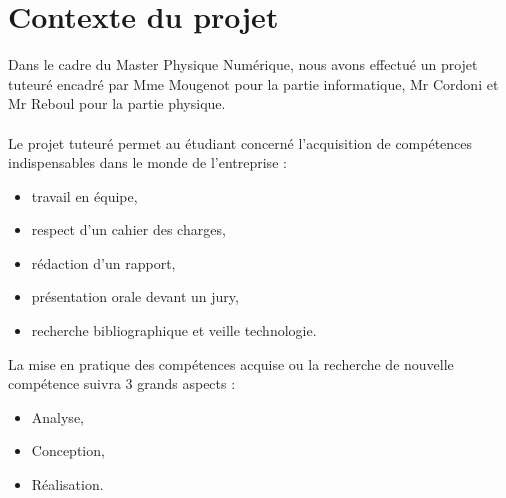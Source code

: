 \documentclass[12pt, a4paper]{report}
\begin{document}
\section{ Contexte du projet}
Dans le cadre du Master Physique Numérique, nous avons effectué un projet tuteuré encadré par Mme Mougenot pour la partie informatique, Mr Cordoni et Mr Reboul pour la partie physique.
\\
\\
Le projet tuteuré permet au étudiant concerné l'acquisition de compétences indispensables dans le monde de l'entreprise : \\
\begin{itemize}
	\item travail en équipe,
	\item respect d'un cahier des charges,
	\item rédaction d'un rapport,
	\item présentation orale devant un jury,
	\item recherche bibliographique et veille technologie.
\end{itemize}
\vspace*{7mm}
La mise en pratique des compétences acquise ou la recherche de nouvelle compétence suivra 3 grands aspects : \\
\begin{itemize}
	\item Analyse,
	\item Conception,
	\item Réalisation.
\end{itemize}
\end{document}
